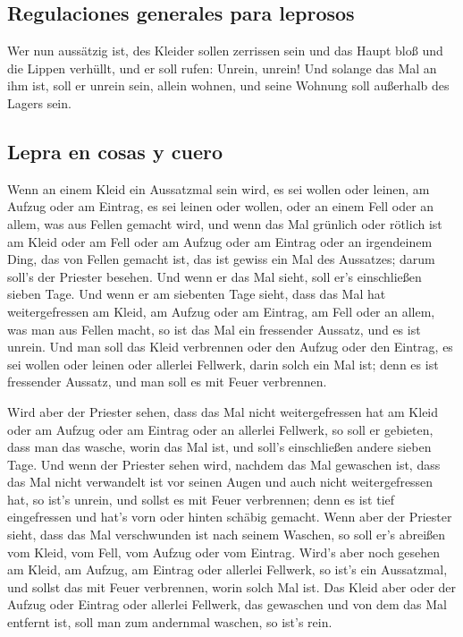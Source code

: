 \hypertarget{regulaciones-generales-para-leprosos}{%
\subsection{Regulaciones generales para
leprosos}\label{regulaciones-generales-para-leprosos}}

 Wer nun aussätzig ist, des Kleider sollen zerrissen sein
und das Haupt bloß und die Lippen verhüllt, und er soll rufen: Unrein,
unrein!  Und solange das Mal an ihm ist, soll er unrein
sein, allein wohnen, und seine Wohnung soll außerhalb des Lagers sein.

\hypertarget{lepra-en-cosas-y-cuero}{%
\subsection{Lepra en cosas y cuero}\label{lepra-en-cosas-y-cuero}}

 Wenn an einem Kleid ein Aussatzmal sein wird, es sei
wollen oder leinen,  am Aufzug oder am Eintrag, es sei
leinen oder wollen, oder an einem Fell oder an allem, was aus Fellen
gemacht wird,  und wenn das Mal grünlich oder rötlich ist
am Kleid oder am Fell oder am Aufzug oder am Eintrag oder an irgendeinem
Ding, das von Fellen gemacht ist, das ist gewiss ein Mal des Aussatzes;
darum soll's der Priester besehen.  Und wenn er das Mal
sieht, soll er's einschließen sieben Tage.  Und wenn er
am siebenten Tage sieht, dass das Mal hat weitergefressen am Kleid, am
Aufzug oder am Eintrag, am Fell oder an allem, was man aus Fellen macht,
so ist das Mal ein fressender Aussatz, und es ist unrein.
 Und man soll das Kleid verbrennen oder den Aufzug oder
den Eintrag, es sei wollen oder leinen oder allerlei Fellwerk, darin
solch ein Mal ist; denn es ist fressender Aussatz, und man soll es mit
Feuer verbrennen.

 Wird aber der Priester sehen, dass das Mal nicht
weitergefressen hat am Kleid oder am Aufzug oder am Eintrag oder an
allerlei Fellwerk,  so soll er gebieten, dass man das
wasche, worin das Mal ist, und soll's einschließen andere sieben Tage.
 Und wenn der Priester sehen wird, nachdem das Mal
gewaschen ist, dass das Mal nicht verwandelt ist vor seinen Augen und
auch nicht weitergefressen hat, so ist's unrein, und sollst es mit Feuer
verbrennen; denn es ist tief eingefressen und hat's vorn oder hinten
schäbig gemacht.  Wenn aber der Priester sieht, dass das
Mal verschwunden ist nach seinem Waschen, so soll er's abreißen vom
Kleid, vom Fell, vom Aufzug oder vom Eintrag.  Wird's
aber noch gesehen am Kleid, am Aufzug, am Eintrag oder allerlei
Fellwerk, so ist's ein Aussatzmal, und sollst das mit Feuer verbrennen,
worin solch Mal ist.  Das Kleid aber oder der Aufzug oder
Eintrag oder allerlei Fellwerk, das gewaschen und von dem das Mal
entfernt ist, soll man zum andernmal waschen, so ist's rein.

